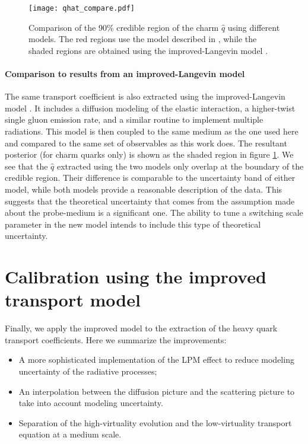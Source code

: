 \begin{figure}
\texttt{[image: qhat\_compare.pdf]}
\caption{Comparison of the 90\% credible region of the charm $\hat{q}$ using different models. The red regions use the model described in \cite{Ke:2018tsh}, while the  shaded regions are obtained using  the improved-Langevin model \cite{Cao:2013ita}.}\label{fig:LBT:compare_qhat}
\end{figure}

\paragraph{Comparison to results from an improved-Langevin model}
The same transport coefficient is also extracted using the improved-Langevin model \cite{Cao:2013ita}.
It includes a diffusion modeling of the elastic interaction, a higher-twist single gluon emission rate, and a similar routine to implement multiple radiations.
This model is then coupled to the same medium as the one used here and compared to the same set of observables as this work does.
The resultant posterior (for charm quarks only) is shown as the shaded region in figure \ref{fig:LBT:compare_qhat}.
We see that the $\hat{q}$ extracted using the two models only overlap at the boundary of the credible region.
Their difference is comparable to the uncertainty band of either model, while both models provide a reasonable description of the data.
This suggests that the theoretical uncertainty that comes from the assumption made about the probe-medium is a significant one.
The ability to tune a switching scale parameter in the new model intends to include this type of theoretical uncertainty.

\section{Calibration using the improved transport model}
Finally, we apply the improved model to the extraction of the heavy quark transport coefficients.
Here we summarize the improvements:
\begin{itemize}
\item A more sophisticated implementation of the LPM effect to reduce modeling uncertainty of the radiative processes;
\item An interpolation between the diffusion picture and the scattering picture to take into account modeling uncertainty.
\item Separation of the high-virtuality evolution and the low-virtuality transport equation at a medium scale.
\end{itemize}

